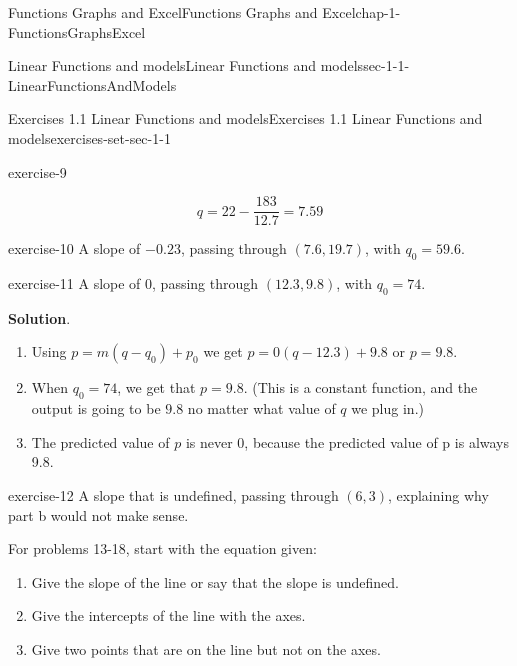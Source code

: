 \documentclass[oneside,10pt,]{book}
\numberwithin{equation}{section}
\begin{document}
\begin{chapterptx}{Functions Graphs and Excel}{}{Functions Graphs and Excel}{}{}{chap-1-FunctionsGraphsExcel}
\begin{sectionptx}{Linear Functions and models}{}{Linear Functions and models}{}{}{sec-1-1-LinearFunctionsAndModels}
\begin{exercises-subsection-numberless}{Exercises 1.1 Linear Functions and models}{}{Exercises 1.1 Linear Functions and models}{}{}{exercises-set-sec-1-1}
\begin{exercisegroup}
\begin{divisionexerciseeg}{9}{}{}{exercise-9}
\begin{enumerate}[label=(\alph*)]
\begin{equation*}
q=22 -\frac{183}{12.7}=7.59
\end{equation*}
\end{enumerate}
\end{divisionexerciseeg}%
\begin{divisionexerciseeg}{10}{}{}{exercise-10}%
\hypertarget{p-104}{}%
A slope of \(-0.23\), passing through \((7.6,19.7)\), with \(q_0=59.6\).%
\end{divisionexerciseeg}%
\begin{divisionexerciseeg}{11}{}{}{exercise-11}%
\hypertarget{p-105}{}%
A slope of 0, passing through \((12.3,9.8)\), with \(q_0=74\).%
\par\smallskip%
\noindent\textbf{Solution}.\hypertarget{solution-6}{}\quad%
\leavevmode%
\begin{enumerate}[label=(\alph*)]
\item\hypertarget{li-45}{}\hypertarget{p-106}{}%
Using \(p=m (q-q_0 )+p_0\)   we get \(p=0 (q-12.3)+9.8\) or \(p=9.8\).%
\item\hypertarget{li-46}{}\hypertarget{p-107}{}%
When \(q_0=74\), we get that \(p=9.8\). (This is a constant function, and the output is going to be \(9.8\) no matter what value of \(q\) we plug in.)%
\item\hypertarget{li-47}{}\hypertarget{p-108}{}%
The predicted value of \(p\) is never  \(0\), because the predicted value of p is always 9.8.%
\end{enumerate}
\end{divisionexerciseeg}%
\begin{divisionexerciseeg}{12}{}{}{exercise-12}%
\hypertarget{p-109}{}%
A slope that is undefined, passing through \((6,3)\), explaining why part b would not make sense.%
\end{divisionexerciseeg}%
\end{exercisegroup}
\par\medskip\noindent
\par\medskip\noindent%
\hypertarget{exercisegroup-3}{}%
\hypertarget{p-110}{}%
For problems 13-18, start with the equation given:%
\leavevmode%
\begin{enumerate}[label=(\alph*)]
\item\hypertarget{li-48}{}\hypertarget{p-111}{}%
Give the slope of the line or say that the slope is undefined.%
\item\hypertarget{li-49}{}\hypertarget{p-112}{}%
Give the intercepts of the line with the axes.%
\item\hypertarget{li-50}{}\hypertarget{p-113}{}%
Give two points that are on the line but not on the axes.%

\end{enumerate}
\end{exercises-subsection-numberless}
\end{sectionptx}
\end{chapterptx}
\end{document}
